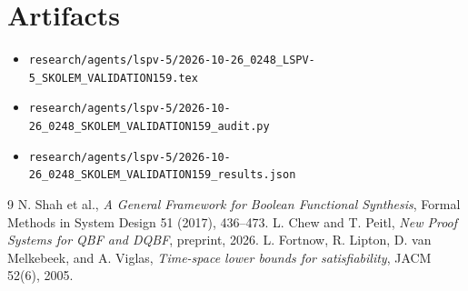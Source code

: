 \documentclass[11pt]{article}
\begin{document}
\section*{Artifacts}
\begin{itemize}
\item \texttt{research/agents/lspv-5/2026-10-26\_0248\_LSPV-5\_SKOLEM\_VALIDATION159.tex}
\item \texttt{research/agents/lspv-5/2026-10-26\_0248\_SKOLEM\_VALIDATION159\_audit.py}
\item \texttt{research/agents/lspv-5/2026-10-26\_0248\_SKOLEM\_VALIDATION159\_results.json}
\end{itemize}

\begin{thebibliography}{9}
 N. Shah et al., \emph{A General Framework for Boolean
Functional Synthesis}, Formal Methods in System Design 51 (2017), 436--473.
 L. Chew and T. Peitl, \emph{New Proof Systems for QBF and
DQBF}, preprint, 2026.
 L. Fortnow, R. Lipton, D. van Melkebeek, and A. Viglas,
\emph{Time-space lower bounds for satisfiability}, JACM 52(6), 2005.
\end{thebibliography}

\end{document}
